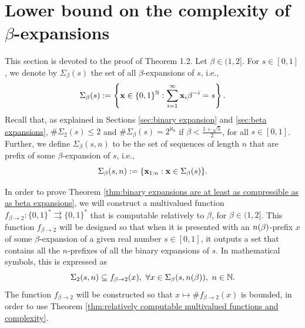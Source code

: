 
\section{\texorpdfstring{Lower bound on the complexity of $\beta$-expansions}{}}

\label{sec:lower bound on the complexity of beta expansions}

This section is devoted to the proof of Theorem 1.2. Let $\beta \in (1,2]$. For $s \in [0,1]$, we denote by $\Sigma_\beta(s)$ the set of all $\beta$-expansions of $s$, i.e.,
\begin{equation}
    \Sigma_\beta(s) := \left\{ {\bf x} \in \{0,1\}^{\mathbb{N}} : \sum_{i=1}^\infty {\bf x}_i \beta^{-i} = s \right\}.
\end{equation}
Recall that, as explained in Sections \ref{sec:binary expansion} and \ref{sec:beta expansions}, $\# \Sigma_2(s) \leq 2$ and $\# \Sigma_\beta(s) = 2^{\aleph_0}$ if $\beta < \frac{1+\sqrt{5}}{2}$, for all $s \in [0,1]$. Further, we define $\Sigma_\beta(s,n)$ to be the set of sequences of length $n$ that are prefix of some $\beta$-expansion of $s$, i.e.,
\begin{equation}
    \Sigma_\beta(s,n) := \{ {\bf x}_{1:n} : {\bf x} \in \Sigma_\beta(s)\}.
\end{equation}

In order to prove Theorem \ref{thm:binary expansions are at least as compressible as as beta expansions}, we will construct a multivalued function $f_{\beta \to 2} : \{0,1\}^\ast  \rightrightarrows \{0,1\}^\ast$ that is computable relatively to $\beta$, for $\beta \in (1,2]$. This function $f_{\beta \to 2}$ will be designed so that when it is presented with an $n(\beta)$-prefix $x$ of some $\beta$-expansion of a given real number $s \in [0,1]$, it outputs a set that contains all the $n$-prefixes of all the binary expansions of $s$. In mathematical symbols, this is expressed as
\begin{equation}
    \Sigma_2(s,n) \subseteq f_{\beta \to 2}(x), \ \forall x \in \Sigma_\beta(s,\nlogbeta), \ n \in \N.
\end{equation}
The function $f_{\beta \to 2}$ will be constructed so that $x \mapsto \# f_{\beta \to 2}(x)$ is bounded, in order to use Theorem \ref{thm:relatively computable multivalued functions and complexity}. 

